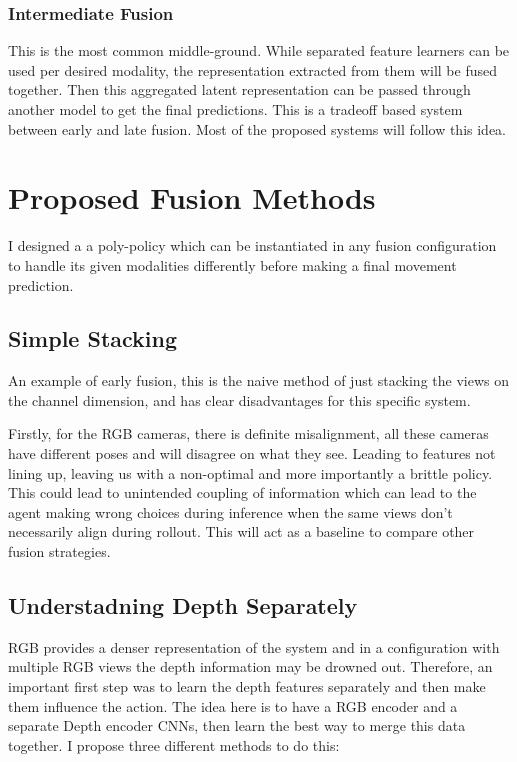 \subsubsection{Intermediate Fusion}
This is the most common middle-ground. While separated feature learners can be used per desired modality, the representation extracted from them will be fused together. Then this aggregated latent representation can be passed through another model to get the final predictions. This is a tradeoff based system between early and late fusion. Most of the proposed systems will follow this idea.


\section{Proposed Fusion Methods}
I designed a a poly-policy which can be instantiated in any fusion configuration to handle its given modalities differently before making a final movement prediction. 

\subsection{Simple Stacking}
An example of early fusion, this is the naive method of just stacking the views on the channel dimension, and has clear disadvantages for this specific system.

Firstly, for the RGB cameras, there is definite misalignment, all these cameras have different poses and will disagree on what they see. Leading to features not lining up, leaving us with a non-optimal and more importantly a brittle policy. This could lead to unintended coupling of information which can lead to the agent making wrong choices during inference when the same views don't necessarily align during rollout. This will act as a baseline to compare other fusion strategies.

\subsection{Understadning Depth Separately}\label{subsec:policies-understand-depth-sep}
RGB provides a denser representation of the system and in a configuration with multiple RGB views the depth information may be drowned out. Therefore, an important first step was to learn the depth features separately and then make them influence the action. The idea here is to have a RGB encoder and a separate Depth encoder CNNs, then learn the best way to merge this data together. I propose three different methods to do this:

